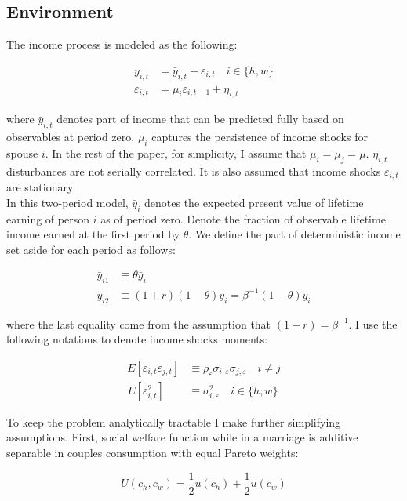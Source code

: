 \subsection{Environment}
The income process is modeled as the following:

\begin{align*}
y_{i,t} &= \bar y_{i,t} + \varepsilon_{i,t} \quad i \in \{h,w\} \\
\varepsilon_{i,t} & = \mu_i \varepsilon_{i, t-1} + \eta_{i,t}
\end{align*}


\noindent where $\bar y_{i,t}$ denotes part of income that can be predicted fully based on observables at period zero.  $\mu_i$ captures the persistence of income shocks for spouse $i$. In the rest of the paper, for simplicity, I assume that \(\mu_i = \mu_j=\mu\).  \( \eta_{i,t} \) disturbances are not serially correlated. It is also assumed that income shocks $\varepsilon_{i,t}$ are stationary. \\

In this two-period model, $\bar y_i$ denotes the expected present value of lifetime earning of person $i$ as of period zero. Denote the fraction of observable lifetime income earned at the first period by $\theta$. We define the part of deterministic income set aside for each period as follows:

\begin{align*}
\bar y_{i1} &\equiv \theta \bar y_{i} \\
\bar y_{i2} &\equiv  (1+r) (1 - \theta) \bar y_{i} = \beta^{-1} (1 - \theta) \bar y_{i} 
\end{align*}

\noindent where the last equality come from the assumption that \((1+r) = \beta^{-1}\). I use the following notations to denote income shocks moments:

\begin{align*}
E[\varepsilon_{i,t}  \varepsilon_{j,t}] &\equiv \rho_\varepsilon \sigma_{i,\varepsilon} \sigma_{j,\varepsilon}  \quad i \neq j\\
E[\varepsilon_{i,t}^2] &\equiv \sigma^2_{i,\varepsilon} \quad i \in \{h,w\}
\end{align*}

To keep the problem analytically tractable I make further simplifying assumptions. First, social welfare function while in a marriage is additive separable in couples consumption with equal Pareto weights:

\begin{equation*}
U(c_h, c_w) = \dfrac{1}{2}u(c_h) + \dfrac{1}{2}u(c_w)
\end{equation*}

